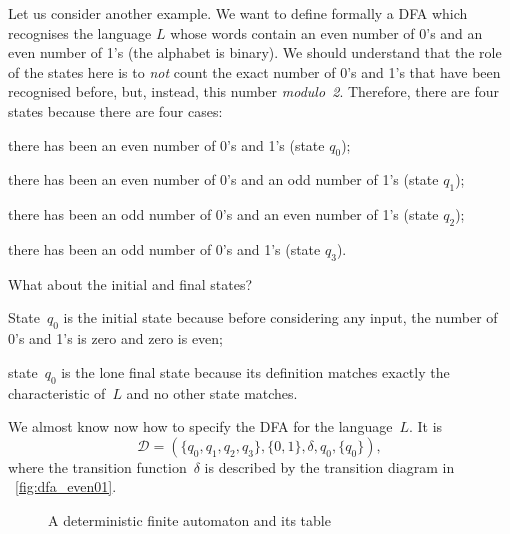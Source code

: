 Let us consider another example. We want to define formally a DFA
which recognises the language \(L\) whose words contain an even number
of 0's and an even number of 1's (the alphabet is binary). We should
understand that the role of the states here is to \emph{not} count the
exact number of 0's and 1's that have been recognised before, but,
instead, this number \emph{modulo~2}. Therefore, there are four states
because there are four cases:
\begin{enumerate*}

  \item there has been an even number of 0's and 1's (state \(q_0\));

  \item there has been an even number of 0's and an odd number of 1's
    (state \(q_1\));

  \item there has been an odd number of 0's and an even number of 1's
    (state \(q_2\));

  \item there has been an odd number of 0's and 1's (state \(q_3\)).

\end{enumerate*}
What about the initial and final states?
\begin{itemize*}

  \item State~\(q_0\) is the initial state because before considering
  any input, the number of 0's and 1's is zero and zero is even;

  \item state~\(q_0\) is the lone final state because its definition
  matches exactly the characteristic of~\(L\) and no other state
  matches.

\end{itemize*}
We almost know now how to specify the DFA for the language~\(L\). It
is
\begin{equation*}
\mathcal{D} = (\{q_0,q_1,q_2,q_3\}, \{0,1\}, \delta,q_0, \{q_0\}),
\end{equation*}
where the transition function~\(\delta\) is described by the
transition diagram in \fig~\vref{fig:dfa_even01}.
\begin{figure}
\centering
{}
\qquad
{}
\caption{A deterministic finite automaton and its table}
\end{figure}
